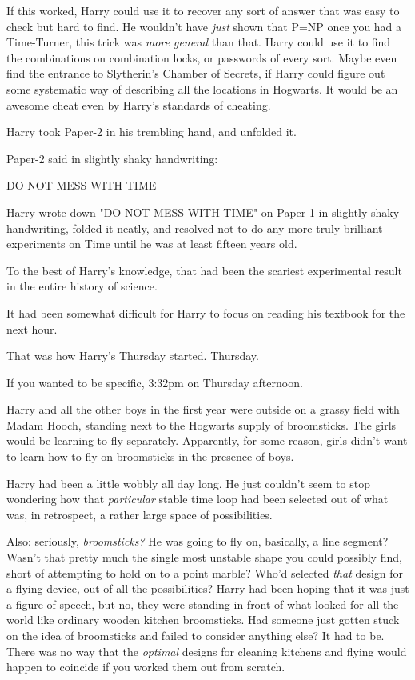 If this worked, Harry could use it to recover any sort of answer that was easy 
to check but hard to find. He wouldn't have \emph{just} shown that P=NP once 
you had a Time-Turner, this trick was \emph{more general} than that. Harry 
could use it to find the combinations on combination locks, or passwords of 
every sort. Maybe even find the entrance to Slytherin's Chamber of Secrets, if 
Harry could figure out some systematic way of describing all the locations in 
Hogwarts. It would be an awesome cheat even by Harry's standards of cheating.

Harry took Paper-2 in his trembling hand, and unfolded it.

Paper-2 said in slightly shaky handwriting:

DO NOT MESS WITH TIME

Harry wrote down "DO NOT MESS WITH TIME" on Paper-1 in slightly shaky 
handwriting, folded it neatly, and resolved not to do any more truly brilliant 
experiments on Time until he was at least fifteen years old.

To the best of Harry's knowledge, that had been the scariest experimental 
result in the entire history of science.

It had been somewhat difficult for Harry to focus on reading his textbook for 
the next hour.

That was how Harry's Thursday started.
\sbreak
Thursday.

If you wanted to be specific, 3:32pm on Thursday afternoon.

Harry and all the other boys in the first year were outside on a grassy field 
with Madam Hooch, standing next to the Hogwarts supply of broomsticks. The 
girls would be learning to fly separately. Apparently, for some reason, girls 
didn't want to learn how to fly on broomsticks in the presence of boys.

Harry had been a little wobbly all day long. He just couldn't seem to stop 
wondering how that \emph{particular} stable time loop had been selected out of 
what was, in retrospect, a rather large space of possibilities.

Also: seriously, \emph{broomsticks?} He was going to fly on, basically, a line 
segment? Wasn't that pretty much the single most unstable shape you could 
possibly find, short of attempting to hold on to a point marble? Who'd selected 
\emph{that} design for a flying device, out of all the possibilities? Harry had 
been hoping that it was just a figure of speech, but no, they were standing in 
front of what looked for all the world like ordinary wooden kitchen 
broomsticks. Had someone just gotten stuck on the idea of broomsticks and 
failed to consider anything else? It had to be. There was no way that the 
\emph{optimal} designs for cleaning kitchens and flying would happen to 
coincide if you worked them out from scratch.

